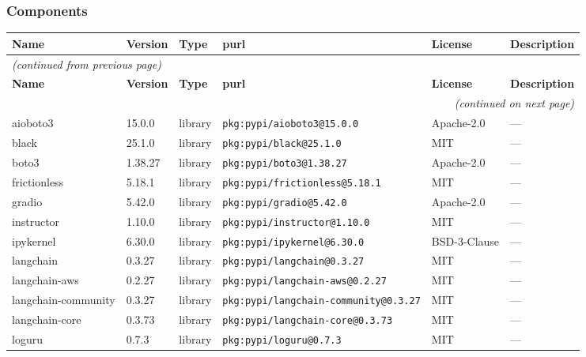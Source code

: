 \documentclass[11pt,a4paper]{article}
\begin{document}
\subsubsection*{Components}
\begin{longtable}{|p{4cm}|p{2cm}|p{1.6cm}|p{5cm}|p{1.5cm}|p{3.5cm}|}
\toprule
\rowcolor{sbomhdr}\textbf{Name} & \textbf{Version} & \textbf{Type} & \textbf{purl} & \textbf{License} & \textbf{Description} \\
\midrule
\endfirsthead
\multicolumn{6}{l}{\small\itshape (continued from previous page)} \\
\toprule
\rowcolor{sbomhdr}\textbf{Name} & \textbf{Version} & \textbf{Type} & \textbf{purl} & \textbf{License} & \textbf{Description} \\
\midrule
\endhead
\midrule
\multicolumn{6}{r}{\small\itshape (continued on next page)} \\
\endfoot
\bottomrule
\endlastfoot
\raggedright aioboto3 & 15.0.0 & library & \small\texttt{pkg:pypi/aioboto3@15.0.0} & Apache-2.0 & \small — \\
\raggedright black & 25.1.0 & library & \small\texttt{pkg:pypi/black@25.1.0} & MIT & \small — \\
\raggedright boto3 & 1.38.27 & library & \small\texttt{pkg:pypi/boto3@1.38.27} & Apache-2.0 & \small — \\
\raggedright frictionless & 5.18.1 & library & \small\texttt{pkg:pypi/frictionless@5.18.1} & MIT & \small — \\
\raggedright gradio & 5.42.0 & library & \small\texttt{pkg:pypi/gradio@5.42.0} & Apache-2.0 & \small — \\
\raggedright instructor & 1.10.0 & library & \small\texttt{pkg:pypi/instructor@1.10.0} & MIT & \small — \\
\raggedright ipykernel & 6.30.0 & library & \small\texttt{pkg:pypi/ipykernel@6.30.0} & BSD-3-Clause & \small — \\
\raggedright langchain & 0.3.27 & library & \small\texttt{pkg:pypi/langchain@0.3.27} & MIT & \small — \\
\raggedright langchain-aws & 0.2.27 & library & \small\texttt{pkg:pypi/langchain-aws@0.2.27} & MIT & \small — \\
\raggedright langchain-community & 0.3.27 & library & \small\texttt{pkg:pypi/langchain-community@0.3.27} & MIT & \small — \\
\raggedright langchain-core & 0.3.73 & library & \small\texttt{pkg:pypi/langchain-core@0.3.73} & MIT & \small — \\
\raggedright loguru & 0.7.3 & library & \small\texttt{pkg:pypi/loguru@0.7.3} & MIT & \small — \\

\end{longtable}
\end{document}
